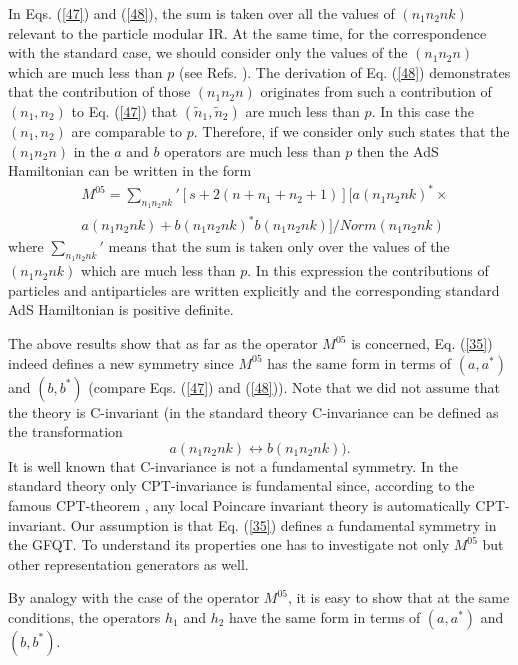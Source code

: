 \documentclass[a4paper,12pt]{article}%
\begin{document}
In Eqs. (\ref{47}) and (\ref{48}), the sum is taken over
all the values of $(n_1n_2nk)$ relevant to the particle modular IR.
At the same time, for the correspondence with the standard
case, we should consider only the values of the $(n_1n_2n)$ which
are much less than $p$ (see Refs. \cite{lev1,lev2}). The 
derivation of Eq. (\ref{48}) demonstrates that the contribution of
those $(n_1n_2n)$ originates from such a
contribution of $(n_1,n_2)$ to Eq. (\ref{47}) that
$({\tilde n}_1,{\tilde n}_2)$ are much less than $p$.
In this case the $(n_1,n_2)$ are comparable to $p$. Therefore,
if we consider only such states that the $(n_1n_2n)$ in the
$a$ and $b$ operators are much less than $p$ then the AdS 
Hamiltonian can be written in the form
\begin{eqnarray}  
&M^{05}=\sum_{n_1n_2nk}' 
[s + 2(n+n_1+n_2+1)][a(n_1n_2nk)^*\times\nonumber\\
&a(n_1n_2nk)+b(n_1n_2nk)^*b(n_1n_2nk)]/Norm(n_1n_2nk)
\label{49}
\end{eqnarray}
where $\sum_{n_1n_2nk}'$ means that the sum is taken only
over the values of the $(n_1n_2nk)$ which are much less than $p$.
In this expression the contributions of particles and
antiparticles are written explicitly and the corresponding
standard AdS Hamiltonian is positive definite.

The above results show that as far as the operator $M^{05}$ is
concerned, Eq. (\ref{35}) indeed defines a new symmetry since
$M^{05}$ has the same form in terms of $(a,a^*)$ and $(b,b^*)$
(compare Eqs. (\ref{47}) and (\ref{48})). Note that we did
not assume that the theory is C-invariant (in the standard
theory C-invariance can be defined as the transformation
$$a(n_1n_2nk)\leftrightarrow b(n_1n_2nk)).$$
It is well known that C-invariance is not a fundamental symmetry.
In the standard theory only CPT-invariance is
fundamental since, according to the famous CPT-theorem \cite{GLR}, 
any local Poincare invariant theory is automatically CPT-invariant. 
Our assumption is that Eq. (\ref{35}) defines a fundamental
symmetry in the GFQT. To understand its properties one has to 
investigate not only $M^{05}$ but other representation generators 
as well.  

By analogy with the case of the operator $M^{05}$, it is easy
to show that at the same conditions, the operators $h_1$ and
$h_2$ have the same form in terms of $(a,a^*)$ and $(b,b^*)$.
\end{document}
